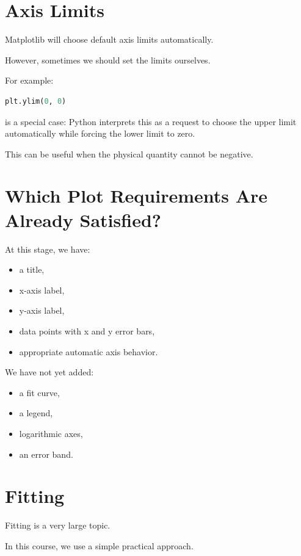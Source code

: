 \documentclass[11pt]{article}
\begin{document}
\section{Axis Limits}

Matplotlib will choose default axis limits automatically.

However, sometimes we should set the limits ourselves.

For example:

\begin{lstlisting}[language=Python]
plt.ylim(0, 0)
\end{lstlisting}

is a special case: Python interprets this as a request to choose the upper limit automatically while forcing the lower limit to zero.

This can be useful when the physical quantity cannot be negative.

\section{Which Plot Requirements Are Already Satisfied?}

At this stage, we have:

\begin{itemize}
    \item a title,
    \item x-axis label,
    \item y-axis label,
    \item data points with x and y error bars,
    \item appropriate automatic axis behavior.
\end{itemize}

We have not yet added:

\begin{itemize}
    \item a fit curve,
    \item a legend,
    \item logarithmic axes,
    \item an error band.
\end{itemize}

\section{Fitting}

Fitting is a very large topic.

In this course, we use a simple practical approach.
\end{document}
